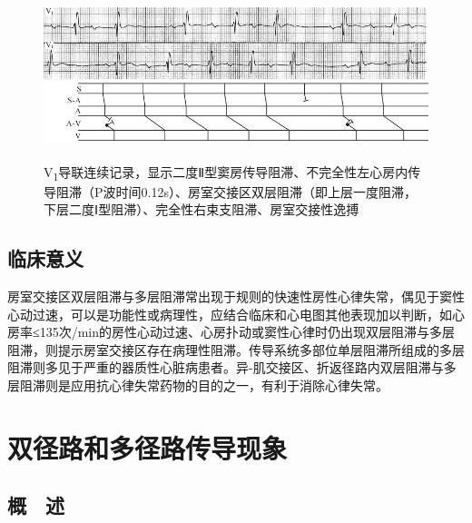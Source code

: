 \begin{figure}[!htbp]
 \centering
 \includegraphics[width=5.61458in,height=1.94792in]{./images/Image00411.jpg}
 \captionsetup{justification=centering}
 \caption{V\textsubscript{1}导联连续记录，显示二度Ⅱ型窦房传导阻滞、不完全性左心房内传导阻滞（P波时间0.12s）、房室交接区双层阻滞（即上层一度阻滞，下层二度Ⅰ型阻滞）、完全性右束支阻滞、房室交接性逸搏}
 \label{fig24-16}
  \end{figure} 


\protect\hypertarget{text00031.htmlux5cux23subid373}{}{}

\section{临床意义}

房室交接区双层阻滞与多层阻滞常出现于规则的快速性房性心律失常，偶见于窦性心动过速，可以是功能性或病理性，应结合临床和心电图其他表现加以判断，如心房率≤135次/min的房性心动过速、心房扑动或窦性心律时仍出现双层阻滞与多层阻滞，则提示房室交接区存在病理性阻滞。传导系统多部位单层阻滞所组成的多层阻滞则多见于严重的器质性心脏病患者。异-肌交接区、折返径路内双层阻滞与多层阻滞则是应用抗心律失常药物的目的之一，有利于消除心律失常。

\protect\hypertarget{text00032.html}{}{}

\protect\hypertarget{text00032.htmlux5cux23chapter32}{}{}

\chapter{双径路和多径路传导现象}

\protect\hypertarget{text00032.htmlux5cux23subid374}{}{}

\section{概　述}

\protect\hypertarget{text00032.htmlux5cux23subid375}{}{}

